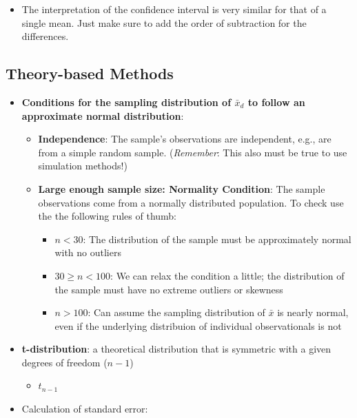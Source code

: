 \documentclass[
]{report}
\providecommand{\tightlist}{%
  \setlength{\itemsep}{0pt}\setlength{\parskip}{0pt}}
\begin{document}
\begin{itemize}
\tightlist
\item
  The interpretation of the confidence interval is very similar for that of a single mean. Just make sure to add the order of subtraction for the differences.
\end{itemize}

\subsection*{Theory-based Methods}\label{theory-based-methods-3}

\begin{itemize}
\item
  \textbf{Conditions for the sampling distribution of \(\bar{x}_d\) to follow an approximate normal distribution}:

  \begin{itemize}
  \item
    \textbf{Independence}: The sample's observations are independent, e.g., are from a simple random sample. (\emph{Remember}: This also must be true to use simulation methods!)
  \item
    \textbf{Large enough sample size: Normality Condition}: The sample observations come from a normally distributed population. To check use the the following rules of thumb:

    \begin{itemize}
    \item
      \(n < 30\): The distribution of the sample must be approximately normal with no outliers
    \item
      \(30 \ge n < 100\): We can relax the condition a little; the distribution of the sample must have no extreme outliers or skewness
    \item
      \(n > 100\): Can assume the sampling distribution of \(\bar{x}\) is nearly normal, even if the underlying distribuion of individual observationals is not
    \end{itemize}
  \end{itemize}
\item
  \textbf{t-distribution}: a theoretical distribution that is symmetric with a given degrees of freedom (\(n-1\))

  \begin{itemize}
  \tightlist
  \item
    \(t_{n-1}\)
  \end{itemize}
\item
  Calculation of standard error:
\end{itemize}
\end{document}
